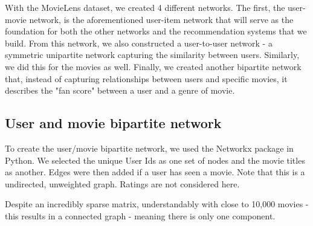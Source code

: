 \documentclass[12pt]{article}
\numberwithin{equation}{section}
\begin{document}
With the MovieLens dataset, we created 4 different networks.  The first, the user-movie network, is the aforementioned user-item network that will serve as the foundation for both the other networks and the recommendation systems that we build. From this network, we also
constructed a user-to-user network - a symmetric unipartite network capturing the similarity between users. Similarly, we did this for the movies as well. Finally, we created another bipartite network that, instead of capturing relationships between users and specific movies, it describes the "fan score" between a user and a genre of movie.

\subsection{User and movie bipartite network}

To create the user/movie bipartite network, we used the Networkx package in Python. We selected the unique User Ids as one set of nodes and the movie titles as another. Edges were then added if a user has seen a movie. Note that this is a undirected, unweighted graph. Ratings are not considered here.

Despite an incredibly sparse matrix, understandably with close to 10,000 movies - this results in a connected graph - meaning there is only one component.
\end{document}
